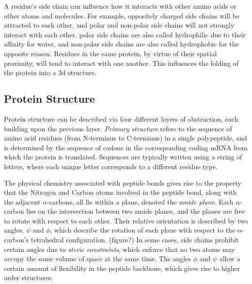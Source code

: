 A residue's side chain can influence how it interacts with other amino acids or other atoms and molecules. For example, oppositely charged side chains will be attracted to each other, and polar and non-polar side chains will not strongly interact with each other. 
polar side chains are also called hydrophilic due to their affinity for water, and non-polar side chains are also called hydrophobic for the opposite reason.
Residues in the same protein, by virtue of their spatial proximity, will tend to interact with one another. 
This influences the folding of the protein into a 3d structure.



\subsection{Protein Structure}

Protein structure can be described via four different layers of abstraction, each building upon the previous layer. 
\textit{Primary structure} refers to the sequence of amino acid residues (from N-terminus to C-terminus) in a single polypeptide, and is determined by the sequence of codons in the corresponding coding mRNA from which the protein is translated.
Sequences are typically written using a string of letters, where each unique letter corresponds to a different residue type. 

The physical chemistry associated with peptide bonds gives rise to the property that the Nitrogen and Carbon atoms involved in the peptide bond, along with the adjacent $\alpha$-carbons, all lie within a plane, denoted the \textit{amide plane}.
Each $\alpha$-carbon lies on the intersection between two amide planes, and the planes are free to rotate with respect to each other. 
Their relative orientation is described by two angles, $\psi$ and $\phi$, which describe the rotation of each plane with respect to the $\alpha$-carbon's tetrahedral configuration. (figure?)
In some cases, side chains prohibit certain angles due to \textit{steric constraints}, which enforce that no two atoms may occupy the same volume of space at the same time.
The angles $\phi$ and $\psi$ allow a certain amount of flexibility in the peptide backbone, which gives rise to higher order structures.

